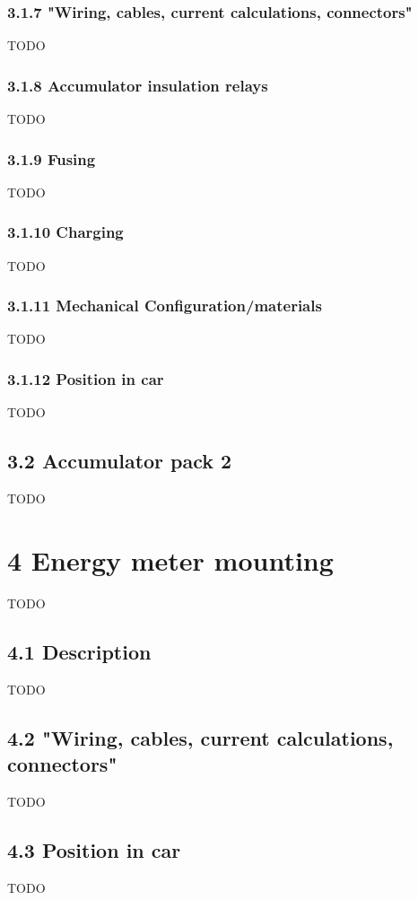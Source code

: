 \documentclass{article}
\begin{document}
\subsubsection*{3.1.7 "Wiring, cables, current calculations, connectors"}
TODO

\subsubsection*{3.1.8 Accumulator insulation relays}
TODO

\subsubsection*{3.1.9 Fusing}
TODO

\subsubsection*{3.1.10 Charging}
TODO

\subsubsection*{3.1.11 Mechanical Configuration/materials}
TODO

\subsubsection*{3.1.12 Position in car}
TODO

\subsection*{3.2 Accumulator pack 2}
TODO

\section*{4 Energy meter mounting}
TODO

\subsection*{4.1 Description}
TODO

\subsection*{4.2 "Wiring, cables, current calculations, connectors"}
TODO

\subsection*{4.3 Position in car}
TODO
\end{document}
